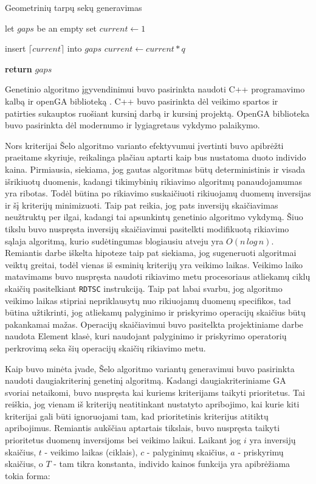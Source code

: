 \documentclass{VUMIFInfBakalaurinis}
\begin{document}
\begin{algorithm}[H]
  \caption{Geometrinių tarpų sekų generavimas}\label{alg:geometric_gaps}
  \begin{algorithmic}[1]
      \State let $gaps$ be an empty set
      \State $current \gets 1$
      
        \State insert $\lceil current \rceil$ into $gaps$
        \State $current \gets current * q$ 
      \EndWhile

      \State \textbf{return} $gaps$
    \EndProcedure
  \end{algorithmic}
\end{algorithm}

Genetinio algoritmo įgyvendinimui buvo pasirinkta naudoti C++ programavimo kalbą ir openGA biblioteką \cite{mohammadi2017openga}.
C++ buvo pasirinkta dėl veikimo spartos ir patirties sukauptos ruošiant kursinį darbą ir kursinį projektą.
OpenGA biblioteka buvo pasirinkta dėl modernumo ir lygiagretaus vykdymo palaikymo.

Nors kriterijai Šelo algoritmo varianto efektyvumui įvertinti buvo apibrėžti praeitame skyriuje,
reikalinga plačiau aptarti kaip bus nustatoma duoto individo kaina.
Pirmiausia, siekiama, jog gautas algoritmas būtų deterministinis ir visada išrikiuotų duomenis, kadangi tikimybinių rikiavimo algoritmų panaudojamumas yra ribotas.
Todėl būtina po rikiavimo suskaičiuoti rikiuojamų duomenų inversijas ir šį kriterijų minimizuoti.
Taip pat reikia, jog pats inversijų skaičiavimas neužtruktų per ilgai, kadangi tai apsunkintų genetinio algoritmo vykdymą.
Šiuo tikslu buvo nuspręsta inversijų skaičiavimui pasitelkti modifikuotą rikiavimo sąlaja algoritmą, kurio sudėtingumas blogiausiu atveju yra $O(n\,log\,n)$.
Remiantis darbe iškelta hipoteze taip pat siekiama, jog sugeneruoti algoritmai veiktų greitai, todėl
vienas iš esminių kriterijų yra veikimo laikas.
Veikimo laiko matavimams buvo nuspręsta naudoti rikiavimo metu procesoriaus atliekamų ciklų skaičių pasitelkiant \verb|RDTSC| instrukciją.
Taip pat labai svarbu, jog algoritmo veikimo laikas stipriai nepriklausytų nuo rikiuojamų duomenų specifikos, tad 
būtina užtikrinti, jog atliekamų palyginimo ir priskyrimo operacijų skaičius būtų pakankamai mažas.
Operacijų skaičiavimui buvo pasitelkta projektiniame darbe naudota Element klasė, kuri naudojant palyginimo ir priskyrimo operatorių
perkrovimą seka šių operacijų skaičių rikiavimo metu.

Kaip buvo minėta įvade, Šelo algoritmo variantų generavimui buvo pasirinkta naudoti daugiakriterinį genetinį algoritmą.
Kadangi daugiakriteriniame GA svoriai netaikomi, buvo nuspręsta kai kuriems kriterijams taikyti prioritetus.
Tai reiškia, jog vienam iš kriterijų neatitinkant nustatyto apribojimo, kai kurie kiti kriterijai gali būti ignoruojami
tam, kad prioritetinis kriterijus atitiktų apribojimus.
Remiantis aukščiau aptartais tikslais, buvo nuspręsta taikyti prioritetus duomenų inversijoms bei veikimo laikui.
Laikant jog $i$ yra inversijų skaičius, $t$ - veikimo laikas (ciklais),
$c$ - palyginimų skaičius, $a$ - priskyrimų skaičius, o $T$ - tam tikra konstanta,
individo kainos funkcija yra apibrėžiama tokia forma:
\end{document}
